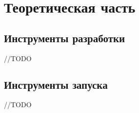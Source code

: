 \section{Теоретическая часть}

\subsection{Инструменты разработки}
    //TODO

\subsection{Инструменты запуска}
    //TODO 
    
        
\clearpage